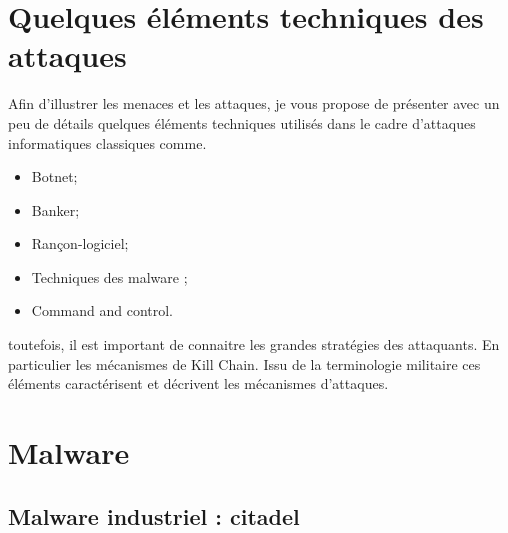 %

\section{Quelques éléments techniques des attaques}

Afin d'illustrer les menaces et les attaques, je vous propose de présenter  avec un peu de détails quelques éléments techniques utilisés dans le cadre d'attaques informatiques classiques comme.

\begin{itemize}
  \item Botnet;
  \item Banker;
  \item Rançon-logiciel;
  \item  Techniques des malware ;
  \item Command and control.
\end{itemize}


toutefois, il est important de connaitre les grandes stratégies des attaquants.
En particulier les mécanismes de Kill Chain. Issu de la terminologie militaire ces éléments caractérisent et décrivent les mécanismes d'attaques.





\section{Malware}

\subsection{Malware industriel : citadel}

